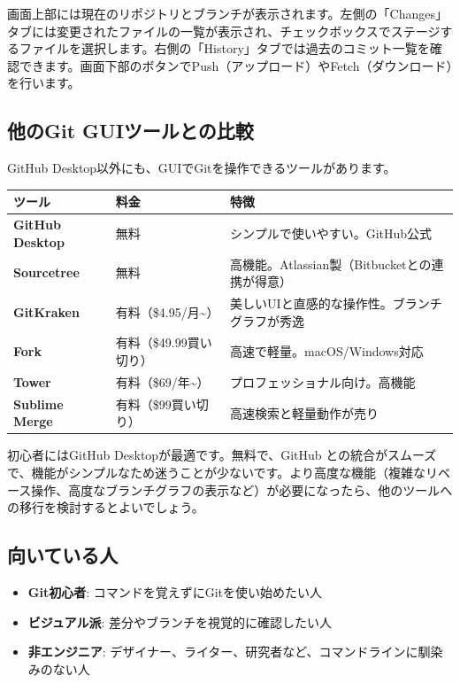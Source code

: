 画面上部には現在のリポジトリとブランチが表示されます。左側の「Changes」タブには変更されたファイルの一覧が表示され、チェックボックスでステージするファイルを選択します。右側の「History」タブでは過去のコミット一覧を確認できます。画面下部のボタンでPush（アップロード）やFetch（ダウンロード）を行います。

\subsection{他のGit GUIツールとの比較}

GitHub Desktop以外にも、GUIでGitを操作できるツールがあります。

\begin{table}[h]
\centering
\begin{tabular}{lll}
\hline
ツール & 料金 & 特徴 \\
\hline
\textbf{GitHub Desktop} & 無料 & シンプルで使いやすい。GitHub公式 \\
\textbf{Sourcetree} & 無料 & 高機能。Atlassian製（Bitbucketとの連携が得意） \\
\textbf{GitKraken} & 有料（\$4.95/月\textasciitilde） & 美しいUIと直感的な操作性。ブランチグラフが秀逸 \\
\textbf{Fork} & 有料（\$49.99買い切り） & 高速で軽量。macOS/Windows対応 \\
\textbf{Tower} & 有料（\$69/年\textasciitilde） & プロフェッショナル向け。高機能 \\
\textbf{Sublime Merge} & 有料（\$99買い切り） & 高速検索と軽量動作が売り \\
\hline
\end{tabular}
\end{table}

初心者にはGitHub Desktopが最適です。無料で、GitHub との統合がスムーズで、機能がシンプルなため迷うことが少ないです。より高度な機能（複雑なリベース操作、高度なブランチグラフの表示など）が必要になったら、他のツールへの移行を検討するとよいでしょう。

\subsection{向いている人}

\begin{itemize}
  \item \textbf{Git初心者}: コマンドを覚えずにGitを使い始めたい人
  \item \textbf{ビジュアル派}: 差分やブランチを視覚的に確認したい人
  \item \textbf{非エンジニア}: デザイナー、ライター、研究者など、コマンドラインに馴染みのない人
\end{itemize}

